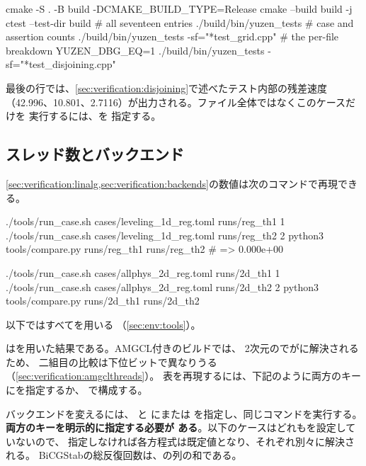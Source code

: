 \begin{shell}
cmake -S . -B build -DCMAKE_BUILD_TYPE=Release
cmake --build build -j
ctest --test-dir build                        # all seventeen entries
./build/bin/yuzen_tests                       # case and assertion counts
./build/bin/yuzen_tests -sf="*test_grid.cpp"  # the per-file breakdown
YUZEN_DBG_EQ=1 ./build/bin/yuzen_tests -sf="*test_disjoining.cpp"
\end{shell}

最後の行では、\cref{sec:verification:disjoining}で述べたテスト内部の残差速度
（42.996、10.801、2.7116）が出力される。ファイル全体ではなくこのケースだけを
実行するには、を
指定する。

\subsection{スレッド数とバックエンド}

\cref{sec:verification:linalg,sec:verification:backends}の数値は次のコマンドで再現できる。

\begin{shell}
./tools/run_case.sh cases/leveling_1d_reg.toml runs/reg_th1 1
./tools/run_case.sh cases/leveling_1d_reg.toml runs/reg_th2 2
python3 tools/compare.py runs/reg_th1 runs/reg_th2            # => 0.000e+00

./tools/run_case.sh cases/allphys_2d_reg.toml runs/2d_th1 1
./tools/run_case.sh cases/allphys_2d_reg.toml runs/2d_th2 2
python3 tools/compare.py runs/2d_th1 runs/2d_th2
\end{shell}

以下ではすべてを用いる
（\cref{sec:env:tools}）。

はを用いた結果である。AMGCL付きのビルドでは、
2次元のでがに解決されるため、
二組目の比較は下位ビットで異なりうる（\cref{sec:verification:amgclthreads}）。
表を再現するには、下記のように両方のキーにを指定するか、
で構成する。

バックエンドを変えるには、
と
にまたは
を指定し、同じコマンドを実行する。\textbf{両方のキーを明示的に指定する必要が
ある}。以下のケースはどれもを設定していないので、
指定しなければ各方程式は既定値となり、それぞれ別々に解決される。
BiCGStabの総反復回数は、の列の和である。

